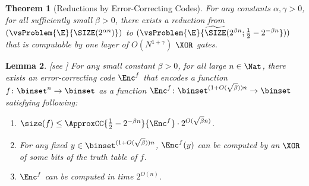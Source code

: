 \documentclass[11pt]{article}
\numberwithin{equation}{section}
\newtheorem{theorem}{Theorem}[section]
\newtheorem{lemma}[theorem]{Lemma}
\theoremstyle{definition}
\theoremstyle{plain}
\begin{document}
\begin{theorem}
  [Reductions by Error-Correcting Codes]
  \label{thm_ECCReduction}
  For any constants $\alpha, \gamma > 0$,
  for all sufficiently small $\beta > 0$,
  there exists
  a reduction from
  $(\vsProblem{\E}{{\SIZE}(2^{\alpha n})})$
  to
  $(\vsProblem{\E}{\widetilde{\SIZE}(2^{\beta n}; \frac{1}{2} - 2^{-\beta n}}))$
  that is computable by one layer of $O(N^{1 + \gamma})$ $\XOR$ gates.
\end{theorem}

\begin{lemma}
  [see   %
    \cite{SudanTV01_jcss_journals, Vadhan12_fttcs_journals, Yekhanin12_fttcs_journals}]
  \label{lemma_ECC}
  For any small constant $\beta > 0$,
  for all large $n \in \Nat$,
  there exists an error-correcting code $\Enc^f$
  that encodes a function $f \colon \binset^n \to \binset$
  as a function $\Enc^f \colon \binset^{(1 + O(\sqrt{\beta})) n} \to \binset$
  satisfying following:
  \begin{enumerate}
    \item
          $\size(f) \le
            \ApproxCC{\frac{1}{2} - 2^{-\beta n}}{\Enc^f}
            \cdot 2^{O(\sqrt{\beta} n)}$.
    \item
          For any fixed $y \in \binset^{(1 + O(\sqrt{\beta})) n}$,
          $\Enc^f(y)$ can be computed by an $\XOR$ of some bits of the truth table of $f$.
    \item
          $\Enc^f$ can be computed in time $2^{O(n)}$.
  \end{enumerate}
\end{lemma}
\end{document}
